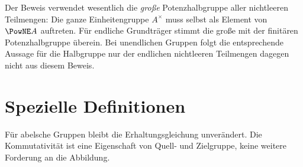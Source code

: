 \documentclass[main.tex]{subfiles}
\begin{document}
\begin{remark}
Der Beweis verwendet wesentlich die \emph{große} Potenzhalbgruppe aller
nichtleeren Teilmengen: Die ganze Einheitengruppe \(A^\times\) muss selbst
als Element von \(\PowNE A\) auftreten.  Für endliche Grundträger stimmt
die große mit der finitären Potenzhalbgruppe überein.  Bei unendlichen
Gruppen folgt die entsprechende Aussage für die Halbgruppe nur der
endlichen nichtleeren Teilmengen dagegen nicht aus diesem Beweis.
\end{remark}

\section{Spezielle Definitionen}

Für abelsche Gruppen bleibt die Erhaltungsgleichung unverändert. Die
Kommutativität ist eine Eigenschaft von Quell- und Zielgruppe, keine weitere
Forderung an die Abbildung.




\end{document}
